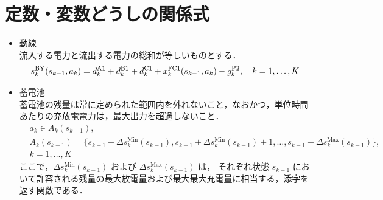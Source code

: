 \section{定数・変数どうしの関係式}
\begin{itemize}
	\item 動線\\
		流入する電力と流出する電力の総和が等しいものとする．
		\begin{equation}
 			s_k^{\rm BY}(s_{k-1},a_{k})= 
	 		d_k^{\rm A1}+ d_k^{\rm B1} + d_k^{\rm C1}+  x_k^{\rm FC1}(s_{k-1},a_{k}) - g_k^{\rm P2},  \quad k=1,\ldots,K
 		 \label{eq:line_dp}
		\end{equation}
	\item 蓄電池\\
		蓄電池の残量は常に定められた範囲内を外れないこと，なおかつ，単位時間あたりの充放電電力は，最大出力を超過しないこと．
		\begin{equation}
       		 \label{eq:line_action_restrict}
        		\begin{split}
            		& a_k \in A_k(s_{k-1}), \\
            		& A_k(s_{k-1}) = \{ s_{k-1} + \Delta s_k^{\mathrm{Min}}(s_{k-1}),s_{k-1} + \Delta s_k^{\mathrm{Min}}(s_{k-1})+1, \dots, s_{k-1} + \Delta s_k^{\mathrm{Max}}(s_{k-1}) \},\\
            		& k=1,\dots,K
        		\end{split}
    		\end{equation}
    		ここで，$\Delta s_k^{\mathrm{Min}}(s_{k-1})$ および $\Delta s_k^{\mathrm{Max}}(s_{k-1})$ は，
		それぞれ状態 $s_{k-1}$ において許容される残量の最大放電量および最大最大充電量に相当する，添字を返す関数である．
		

\end{itemize}
